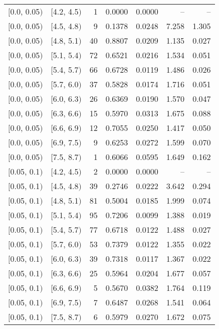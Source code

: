 \begin{longtable}{| l | l | r | r | r | r | r |}
        $[$0.0, 0.05$)$ & $[$4.2, 4.5$)$ & 1   & 0.0000 & 0.0000 & -- & -- \\
        $[$0.0, 0.05$)$ & $[$4.5, 4.8$)$ & 9   & 0.1378 & 0.0248 & 7.258 & 1.305 \\
        $[$0.0, 0.05$)$ & $[$4.8, 5.1$)$ & 40  & 0.8807 & 0.0209 & 1.135 & 0.027 \\
        $[$0.0, 0.05$)$ & $[$5.1, 5.4$)$ & 72  & 0.6521 & 0.0216 & 1.534 & 0.051 \\
        $[$0.0, 0.05$)$ & $[$5.4, 5.7$)$ & 66  & 0.6728 & 0.0119 & 1.486 & 0.026 \\
        $[$0.0, 0.05$)$ & $[$5.7, 6.0$)$ & 37  & 0.5828 & 0.0174 & 1.716 & 0.051 \\
        $[$0.0, 0.05$)$ & $[$6.0, 6.3$)$ & 26  & 0.6369 & 0.0190 & 1.570 & 0.047 \\
        $[$0.0, 0.05$)$ & $[$6.3, 6.6$)$ & 15  & 0.5970 & 0.0313 & 1.675 & 0.088 \\
        $[$0.0, 0.05$)$ & $[$6.6, 6.9$)$ & 12  & 0.7055 & 0.0250 & 1.417 & 0.050 \\
        $[$0.0, 0.05$)$ & $[$6.9, 7.5$)$ & 9   & 0.6253 & 0.0272 & 1.599 & 0.070 \\
        $[$0.0, 0.05$)$ & $[$7.5, 8.7$)$ & 1   & 0.6066 & 0.0595 & 1.649 & 0.162 \\
        $[$0.05, 0.1$)$ & $[$4.2, 4.5$)$ & 2   & 0.0000 & 0.0000 & -- & -- \\
        $[$0.05, 0.1$)$ & $[$4.5, 4.8$)$ & 39  & 0.2746 & 0.0222 & 3.642 & 0.294 \\
        $[$0.05, 0.1$)$ & $[$4.8, 5.1$)$ & 81  & 0.5004 & 0.0185 & 1.999 & 0.074 \\
        $[$0.05, 0.1$)$ & $[$5.1, 5.4$)$ & 95  & 0.7206 & 0.0099 & 1.388 & 0.019 \\
        $[$0.05, 0.1$)$ & $[$5.4, 5.7$)$ & 77  & 0.6718 & 0.0122 & 1.488 & 0.027 \\
        $[$0.05, 0.1$)$ & $[$5.7, 6.0$)$ & 53  & 0.7379 & 0.0122 & 1.355 & 0.022 \\
        $[$0.05, 0.1$)$ & $[$6.0, 6.3$)$ & 39  & 0.7318 & 0.0117 & 1.367 & 0.022 \\
        $[$0.05, 0.1$)$ & $[$6.3, 6.6$)$ & 25  & 0.5964 & 0.0204 & 1.677 & 0.057 \\
        $[$0.05, 0.1$)$ & $[$6.6, 6.9$)$ & 5   & 0.5670 & 0.0382 & 1.764 & 0.119 \\
        $[$0.05, 0.1$)$ & $[$6.9, 7.5$)$ & 7   & 0.6487 & 0.0268 & 1.541 & 0.064 \\
        $[$0.05, 0.1$)$ & $[$7.5, 8.7$)$ & 6   & 0.5979 & 0.0270 & 1.672 & 0.075 \\

\end{longtable}
